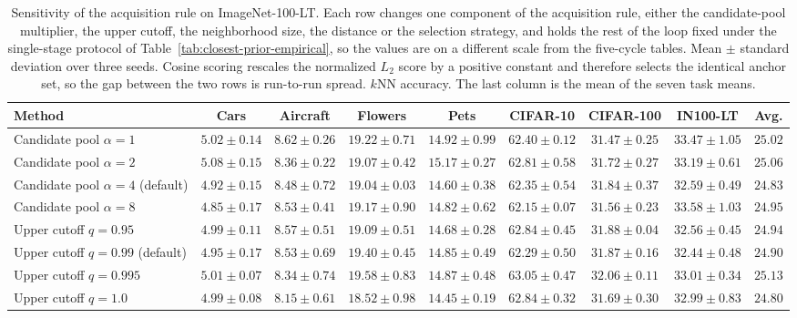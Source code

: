 \begin{table}[t]
\centering
\small
\setlength{\tabcolsep}{4pt}
\caption{Sensitivity of the acquisition rule on ImageNet-100-LT. Each row changes one component of the acquisition rule, either the candidate-pool multiplier, the upper cutoff, the neighborhood size, the distance or the selection strategy, and holds the rest of the loop fixed under the single-stage protocol of Table~\ref{tab:closest-prior-empirical}, so the values are on a different scale from the five-cycle tables. Mean $\pm$ standard deviation over three seeds. Cosine scoring rescales the normalized $L_2$ score by a positive constant and therefore selects the identical anchor set, so the gap between the two rows is run-to-run spread. $k$NN accuracy. The last column is the mean of the seven task means.}
\label{tab:selector-robustness-full-knn}
\begin{adjustbox}{max width=\textwidth}
\begin{tabular}{lcccccccc}
\toprule
Method & Cars & Aircraft & Flowers & Pets & CIFAR-10 & CIFAR-100 & IN100-LT & Avg. \\
\midrule
Candidate pool $\alpha=1$ & $5.02\pm0.14$ & $8.62\pm0.26$ & $19.22\pm0.71$ & $14.92\pm0.99$ & $62.40\pm0.12$ & $31.47\pm0.25$ & $33.47\pm1.05$ & $25.02$ \\
Candidate pool $\alpha=2$ & $5.08\pm0.15$ & $8.36\pm0.22$ & $19.07\pm0.42$ & $15.17\pm0.27$ & $62.81\pm0.58$ & $31.72\pm0.27$ & $33.19\pm0.61$ & $25.06$ \\
Candidate pool $\alpha=4$ (default) & $4.92\pm0.15$ & $8.48\pm0.72$ & $19.04\pm0.03$ & $14.60\pm0.38$ & $62.35\pm0.54$ & $31.84\pm0.37$ & $32.59\pm0.49$ & $24.83$ \\
Candidate pool $\alpha=8$ & $4.85\pm0.17$ & $8.53\pm0.41$ & $19.17\pm0.90$ & $14.82\pm0.62$ & $62.15\pm0.07$ & $31.56\pm0.23$ & $33.58\pm1.03$ & $24.95$ \\
Upper cutoff $q=0.95$ & $4.99\pm0.11$ & $8.57\pm0.51$ & $19.09\pm0.51$ & $14.68\pm0.28$ & $62.84\pm0.45$ & $31.88\pm0.04$ & $32.56\pm0.45$ & $24.94$ \\
Upper cutoff $q=0.99$ (default) & $4.95\pm0.17$ & $8.53\pm0.69$ & $19.40\pm0.45$ & $14.85\pm0.49$ & $62.29\pm0.50$ & $31.87\pm0.16$ & $32.44\pm0.48$ & $24.90$ \\
Upper cutoff $q=0.995$ & $5.01\pm0.07$ & $8.34\pm0.74$ & $19.58\pm0.83$ & $14.87\pm0.48$ & $63.05\pm0.47$ & $32.06\pm0.11$ & $33.01\pm0.34$ & $25.13$ \\
Upper cutoff $q=1.0$ & $4.99\pm0.08$ & $8.15\pm0.61$ & $18.52\pm0.98$ & $14.45\pm0.19$ & $62.84\pm0.32$ & $31.69\pm0.30$ & $32.99\pm0.83$ & $24.80$ \\

\end{tabular}
\end{adjustbox}
\end{table}
